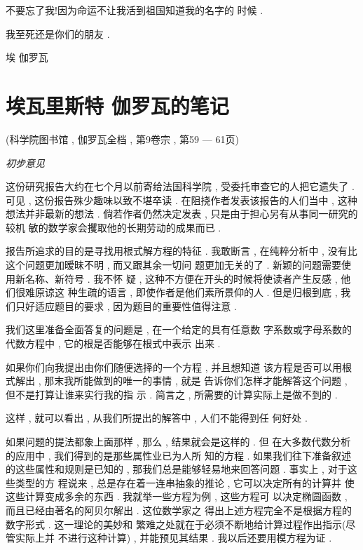不要忘了我!因为命运不让我活到祖国知道我的名字的 时候 . 

我至死还是你们的朋友 . 

\begin{flushright}
	埃 \textbullet 伽罗瓦
\end{flushright}

\section{埃瓦里斯特 \textbullet 伽罗瓦的笔记}
\begin{center}
	(科学院图书馆 , 伽罗瓦全档 , 第9卷宗 , 第59 — 61页)
\end{center}

\begin{center}
	\emph{初步意见}
\end{center}

这份研究报告大约在七个月以前寄给法国科学院 , 受委托审查它的人把它遗失了 . 可见 , 这份报告殊少趣味以致不堪卒读 .  在阻挠作者发表该报告的人们当中 , 这种想法并非最新的想法 .  倘若作者仍然决定发表 , 只是由于担心另有从事同一研究的较机 敏的数学家会攫取他的长期劳动的成果而已 . 

报告所追求的目的是寻找用根式解方程的特征 . 我敢断言 ,  在纯粹分析中 , 没有比这个问题更加暧昧不明 , 而又跟其余一切问 题更加无关的了 . 新颖的问题需要使用新名称、新符号 . 我不怀 疑 , 这种不方便在开头的时候将使读者产生反感 , 他们很难原谅这 种生疏的语言 , 即使作者是他们素所景仰的人 . 但是归根到底 , 我 们只好适应题目的要求 , 因为题目的重要性值得注意 . 

我们这里准备全面答复的问题是 , 在一个给定的具有任意数 字系数或字母系数的代数方程中 , 它的根是否能够在根式中表示 出来 . 

如果你们向我提出由你们随便选择的一个方程 , 并且想知道 该方程是否可以用根式解出 , 那末我所能做到的唯一的事情 , 就是 告诉你们怎样才能解答这个问题 , 但不是打算让谁来实行我的指 示 . 简言之 , 所需要的计算实际上是做不到的 . 


这样 , 就可以看出 , 从我们所提出的解答中 , 人们不能得到任 何好处 . 

如果问题的提法都象上面那样 , 那么 , 结果就会是这样的 . 但 在大多数代数分析的应用中 , 我们得到的是那些属性业已为人所 知的方程 . 如果我们往下准备叙述的这些属性和规则是已知的 ,  那我们总是能够轻易地来回答问题 . 事实上 , 对于这些类型的方 程说来 , 总是存在着一连串抽象的推论 , 它可以决定所有的计算并 使这些计算变成多余的东西 . 我就举一些方程为例 , 这些方程可 以决定椭圆函数 , 而且已经由著名的阿贝尔解出 . 这位数学家之 得出上述方程完全不是根据方程的数字形式 . 这一理论的美妙和 繁难之处就在于必须不断地给计算过程作出指示(尽管实际上并 不进行这种计算) , 并能预见其结果 . 我以后还要用模方程为证 . 

